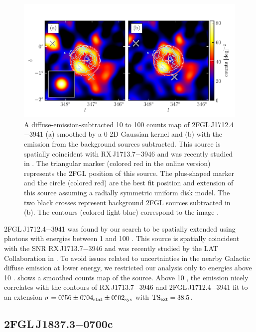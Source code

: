 \begin{figure}[htbp]
  \includegraphics{source_plots/source_RX_J1713d7-3946_color.pdf}
  \caption{A diffuse-emission-subtracted 10 \gev to 100 \gev counts map
  of 2FGL\,J1712.4$-$3941 (a) smoothed by a 0 2D Gaussian kernel
  and (b) with the emission from the background sources subtracted.
  This source is spatially coincident with RX\,J1713.7$-$3946 and
  was recently studied in \cite{abdo_2011a_observations-young}.
  The triangular marker (colored red in the online version) represents
  the 2FGL position of this source.  The plus-shaped marker and the
  circle (colored red) are the best fit position and extension of this
  source assuming a radially symmetric uniform disk model.  The two
  black crosses represent background 2FGL sources subtracted in (b).
  The contours (colored light blue) correspond to the \tev image
  \citep{aharonian_2007a_primary-particle}.}
\end{figure}

2FGL\,J1712.4$-$3941 was found by our search to be spatially extended
using photons with energies between 1 \gev and 100 \gev.  This source
is spatially coincident with the SNR RX\,J1713.7$-$3946 and was recently
studied by the LAT Collaboration in \cite{abdo_2011a_observations-young}.
To avoid issues related to uncertainties in the nearby Galactic
diffuse emission at lower energy, we restricted our analysis only
to energies above 10 \gev.   shows a
smoothed counts map of the source. Above 10 \gev, the \gev emission
nicely correlates with the \tev contours of RX\,J1713.7$-$3946
\citep{aharonian_2007a_primary-particle} and 2FGL\,J1712.4$-$3941 fit
to an extension $\sigma=0\mbox{$.\!\!^\circ$}56\pm0\mbox{$.\!\!^\circ$}04_\text{stat}\pm0\mbox{$.\!\!^\circ$}02_\text{sys}$ with
$\mathrm{TS}_\mathrm{ext}=38.5$.

\subsection{2FGL\,J1837.3$-$0700c}

